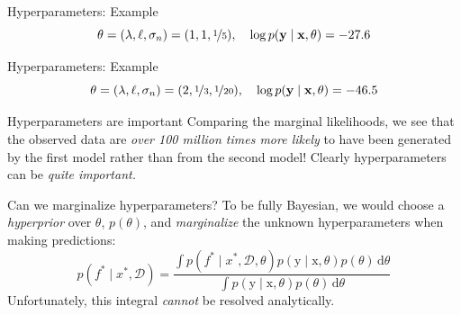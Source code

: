 \documentclass[xcolor={dvipsnames},hyperref={breaklinks=true},12pt]{beamer}
\newcommand{\given}{\mid}
\newcommand{\mc}[1]{\mathcal{#1}}
\newcommand{\data}{\mc{D}}
\newcommand{\intd}[1]{\,\mathrm{d}{#1}}
\renewcommand{\vec}[1]{\bm{\mathrm{#1}}}
\newcommand{\emphr}[1]{{\textcolor{or}{\itshape #1}}}
\begin{document}
\begin{frame}{Hyperparameters: Example}
  \hspace*{-1.5em}
  \begin{equation*}
    \theta = (\lambda, \ell, \sigma_n) = (1, 1, \nicefrac{1}{5}),
    \quad
    \log p(\vec{y} \given \vec{x}, \theta) = -27.6
  \end{equation*}
\end{frame}

\begin{frame}{Hyperparameters: Example}
  \hspace*{-1.5em}
  \begin{equation*}
    \theta = (\lambda, \ell, \sigma_n) = (2, \nicefrac{1}{3}, \nicefrac{1}{20}),
    \quad
    \log p(\vec{y} \given \vec{x}, \theta) = -46.5
  \end{equation*}
\end{frame}

\begin{frame}{Hyperparameters are important}
  Comparing the marginal likelihoods, we see that the observed data
  are \emphr{over 100 million times more likely} to have been
  generated by the first model rather than from the second model!
  Clearly hyperparameters can be \emphr{quite important.}
\end{frame}

\begin{frame}{Can we marginalize hyperparameters?}
  To be fully Bayesian, we would choose a \emphr{hyperprior}
  over $\theta$, $p(\theta)$, and \emphr{marginalize} the unknown
  hyperparameters when making predictions:
  \begin{equation*}
    p(f^\ast \given x^\ast, \data) =
    \frac
    {\int
      p(f^\ast \given x^\ast, \data, \theta)
      p(\vec{y} \given \vec{x}, \theta)
      p(\theta)
      \intd{\theta}
    }
    {\int
      p(\vec{y} \given \vec{x}, \theta)
      p(\theta)
      \intd{\theta}
    }
  \end{equation*}
  Unfortunately, this integral \emphr{cannot} be resolved
  analytically.
\end{frame}
\end{document}
